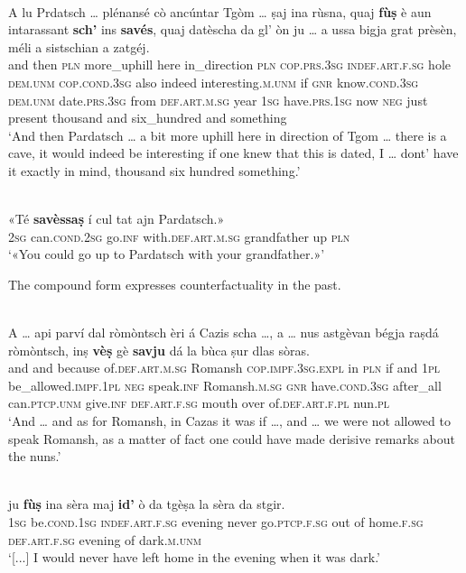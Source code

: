 \ea\label{ex:conddir1}
\\
\gll A lu Prdatsch … plénansé cò ancúntar Tgòm … ṣaj ina rùsna, quaj \textbf{fùṣ} è aun intarassant \textbf{sch’} ins \textbf{savés}, quaj datèscha da gl' òn ju … a ussa bigja grat prèsèn, méli a sistschian a zatgéj.\\
and then \textsc{pln} {} more\_uphill here in\_direction \textsc{pln} {} \textsc{cop.prs.3sg} \textsc{indef.art.f.sg} hole \textsc{dem.unm} \textsc{cop.cond.3sg} also indeed interesting.\textsc{m.unm} if \textsc{gnr} know.\textsc{cond.3sg} \textsc{dem.unm} date.\textsc{prs.3sg} from \textsc{def.art.m.sg} year \textsc{1sg} {} have.\textsc{prs.1sg} now \textsc{neg} just present thousand and six\_hundred and something\\
\glt `And then Pardatsch … a bit more uphill here in direction of Tgom … there is a cave, it would indeed be interesting if one knew that this is dated, I … dont' have it exactly in mind, thousand six hundred something.'
\z

\ea
\label{ex:conddir2}
\\
\gll  «Té \textbf{savèssaṣ} í cul tat ajn Pardatsch.»  \\
\textsc{2sg} can.\textsc{cond.2sg} go.\textsc{inf} with.\textsc{def.art.m.sg} grandfather up \textsc{pln}  \\
\glt `«You could go up to Pardatsch with your grandfather.»'
\z

The compound form expresses counterfactuality in the past.

\ea
\label{ex:conddir3}
\\
\gll    A … api parví dal ròmòntsch èri á Cazis scha …, a … nus astgèvan bégja raṣdá ròmòntsch, inṣ \textbf{vèṣ} gè \textbf{savju} dá la bùca ṣur dlas sòras.\\
and {} and because of.\textsc{def.art.m.sg} Romansh \textsc{cop.impf.3sg.expl} in \textsc{pln} if {} and {} \textsc{1pl} be\_allowed.\textsc{impf.1pl} \textsc{neg} speak.\textsc{inf} Romansh.\textsc{m.sg} \textsc{gnr}  have.\textsc{cond.3sg} after\_all can.\textsc{ptcp.unm} give.\textsc{inf} \textsc{def.art.f.sg} mouth over of.\textsc{def.art.f.pl} nun.\textsc{pl}\\
\glt `And … and as for Romansh, in Cazas it was if …, and … we were not allowed to speak Romansh, as a matter of fact one could have made derisive remarks about the nuns.'
\z

\ea
\label{ex:conddir4}
\\
\gll  [...] ju \textbf{fùṣ} ina sèra maj \textbf{id’} ò da tgèṣa la sèra da stgir. \\
{} \textsc{1sg} be.\textsc{cond.1sg} \textsc{indef.art.f.sg} evening never go.\textsc{ptcp.f.sg} out of home.\textsc{f.sg} \textsc{def.art.f.sg} evening of dark.\textsc{m.unm}\\
\glt `[...] I would never have left home in the evening when it was dark.'
\z

